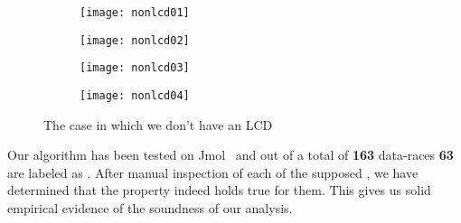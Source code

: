 \begin{figure}
        \begin{subfigure}[l]{0.3\textwidth}
                \centering
                \texttt{[image: nonlcd01]}
                \caption{}
                \label{fig:lcd-notlcd01}
        \end{subfigure}%
        \begin{subfigure}[r]{0.3\textwidth}
                \centering
                \texttt{[image: nonlcd02]}
                \caption{}
                \label{fig:lcd-notlcd02}
        \end{subfigure}
        
        \begin{subfigure}[l]{0.3\textwidth}
                \centering
                \texttt{[image: nonlcd03]}
                \caption{}
                \label{fig:lcd-notlcd03}
        \end{subfigure}
            \begin{subfigure}[r]{0.3\textwidth}
                \centering
                \texttt{[image: nonlcd04]}
                \caption{}
                \label{fig:lcd-notlcd04}
        \end{subfigure}
        \caption{The case in which we don't have an LCD}\label{fig:lcd-notlcd}
\end{figure}

Our algorithm has been tested on Jmol~\cite{Jmol-site} and out of a total of
\textbf{163} data-races \textbf{63} are labeled as \lcds. After manual
inspection of each of the supposed \slcds, we have determined that the property
indeed holds true for them. This gives us solid empirical evidence of the
soundness of our analysis.
